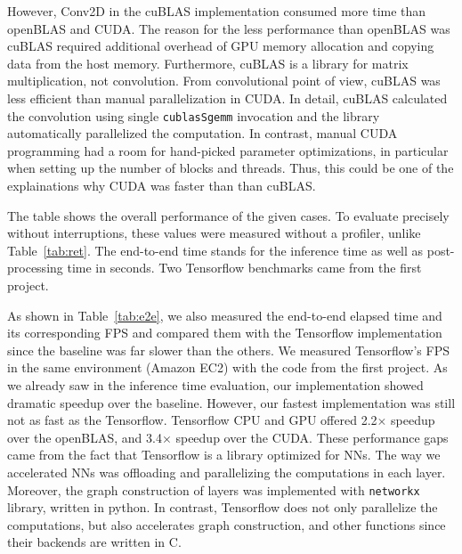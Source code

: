 \documentclass[a4paper,12pt]{article}
\begin{document}
However, Conv2D in the cuBLAS implementation consumed more time than openBLAS and CUDA\@. 
The reason for the less performance than openBLAS was cuBLAS required additional overhead of GPU memory allocation and copying data from the host memory. 
Furthermore, cuBLAS is a library for matrix multiplication, not convolution. 
From convolutional point of view, cuBLAS was less efficient than manual parallelization in CUDA\@. In detail, cuBLAS calculated the convolution using single \lstinline{cublasSgemm} invocation and the library automatically parallelized the computation.
In contrast, manual CUDA programming had a room for hand-picked parameter optimizations, in particular when setting up the number of blocks and threads. 
Thus, this could be one of the explainations why CUDA was faster than than cuBLAS\@. 

\begin{table}[htbp]
\centering
{}
\caption{The table shows the overall performance of the given cases. To evaluate precisely without interruptions, these values were measured without a profiler, unlike Table~\ref{tab:ret}. The end-to-end time stands for the inference time as well as post-processing time in seconds. Two Tensorflow benchmarks came from the first project.}
\label{tab:e2e}
\end{table}

As shown in Table~\ref{tab:e2e}, we also measured the end-to-end elapsed time and its corresponding FPS and compared them with the Tensorflow implementation since the baseline was far slower than the others. We measured Tensorflow's FPS in the same environment (Amazon EC2) with the code from the first project. As we already saw in the inference time evaluation, our implementation showed dramatic speedup over the baseline. However, our fastest implementation was still not as fast as the Tensorflow. Tensorflow CPU and GPU offered 2.2$\times$ speedup over the openBLAS, and 3.4$\times$ speedup over the CUDA\@.
These performance gaps came from the fact that Tensorflow is a library optimized for NNs. The way we accelerated NNs was offloading and parallelizing the computations in each layer. Moreover, the graph construction of layers was implemented with \lstinline{networkx} library, written in python. 
In contrast, Tensorflow does not only parallelize the computations, but also accelerates graph construction, and other functions since their backends are written in C. 
\end{document}

